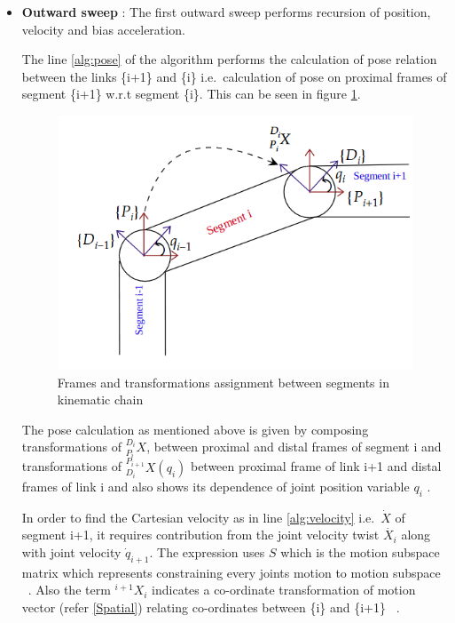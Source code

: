 \begin{itemize}
	\item \textbf{Outward sweep} : The first outward sweep performs recursion of position, velocity and bias acceleration.
	
	
The line \ref{alg:pose} of the algorithm performs the calculation of pose relation between the links \{i+1\} and \{i\} i.e.\ calculation of pose on proximal frames of segment \{i+1\} w.r.t segment \{i\}. This can be seen in figure \ref{Segment Transformation}.
	\begin{figure}
		\centering
		\includegraphics[scale=0.6]{images/segment_pose2}
		\caption{Frames and transformations assignment between segments in kinematic chain}
		\label{Segment Transformation}
	\end{figure}
The pose calculation as mentioned above is given by composing transformations of ${}^{D_{i}}_{P_{i}}X$, between proximal and distal frames of segment {i} and transformations of ${}^{P_{i+1}}_{D_i}X(q_i)$ between proximal frame of link {i+1} and distal frames of link {i} and also shows its dependence of joint position variable $q_{i}$ \cite{shakhimardanov2015composable}. 


In order to find the Cartesian velocity as in line \ref{alg:velocity} i.e.\ $\dot{X}$ of segment i+1, it requires contribution from the joint velocity twist $\dot{X_{i}}$ along with joint velocity $\dot{q}_{i+1}$. The expression uses $S$ which is the motion subspace matrix which represents constraining every joints motion to motion subspace ~\cite{featherstone2014rigid}. Also the term ${}^{i+1}X_{i}$ indicates a co-ordinate transformation of motion vector (refer \ref{Spatial}) relating co-ordinates between \{i\} and \{i+1\} ~\cite{shakhimardanov2015composable}.



\end{itemize}
